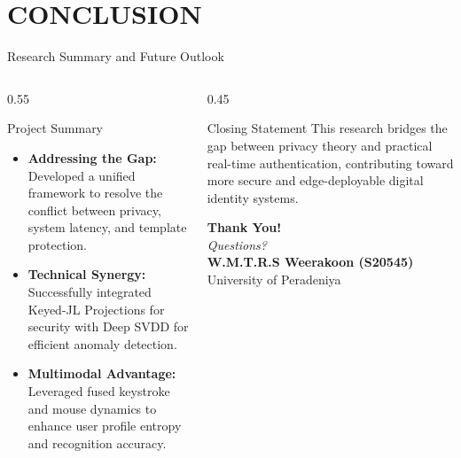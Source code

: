 
\section{CONCLUSION}

\begin{frame}{Research Summary and Future Outlook}
    \vspace{-1.5em}
    \begin{columns}[T]
        \begin{column}{0.55\textwidth}
            \begin{block}{Project Summary}
                \fontsize{8.5pt}{10.5pt}\selectfont
                \begin{itemize}
                    \setlength{\itemsep}{6pt}
                    \item \textbf{Addressing the Gap:} Developed a unified framework to resolve the conflict between privacy, system latency, and template protection.
                    \item \textbf{Technical Synergy:} Successfully integrated Keyed-JL Projections for security with Deep SVDD for efficient anomaly detection.
                    \item \textbf{Multimodal Advantage:} Leveraged fused keystroke and mouse dynamics to enhance user profile entropy and recognition accuracy.
                \end{itemize}
            \end{block}
        \end{column}

        \begin{column}{0.45\textwidth}
            \begin{block}{Closing Statement}
                \fontsize{8.5pt}{10.5pt}\selectfont
                This research bridges the gap between privacy theory and practical real-time authentication, contributing toward more secure and edge-deployable digital identity systems.
            \end{block}
            
            \vspace{0.8cm}
            \centering
            \textbf{\Large Thank You!} \\
            \vspace{0.3cm}
            \scriptsize \textit{Questions?} \\
            \vspace{0.4cm}
            \tiny \textbf{W.M.T.R.S Weerakoon (S20545)} \\
            University of Peradeniya
        \end{column}
    \end{columns}
\end{frame}